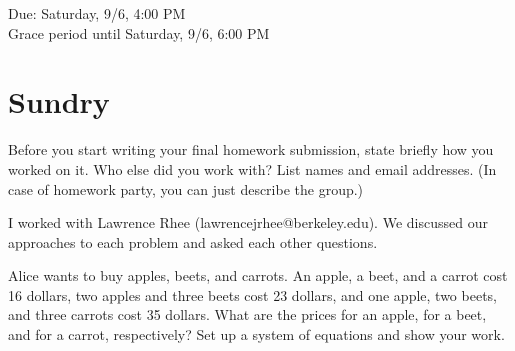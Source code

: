 \documentclass[11pt]{article}
\begin{document}
\maketitle
\fontsize{12}{15}\selectfont

\begin{center}
    Due: Saturday, 9/6, 4:00 PM \\
    Grace period until Saturday, 9/6, 6:00 PM \\
\end{center}

\section*{Sundry}
Before you start writing your final homework submission, state briefly how you worked on it.  Who else did you work with?  List names and email addresses.  (In case of homework party, you can just describe the group.)

\begin{solution}
  I worked with Lawrence Rhee (lawrencejrhee@berkeley.edu). 
  We discussed our approaches to each problem and asked each other questions.  
\end{solution}

\vspace{15pt}


Alice wants to buy apples, beets, and carrots. An apple, a beet, and a carrot cost 16 dollars, two apples and three beets cost 23 dollars, and one apple, two beets, and three carrots cost 35 dollars. What are the prices for an apple, for a beet, and for a carrot, respectively? Set up a system of equations and show your work.
\end{document}
